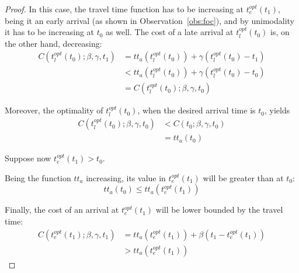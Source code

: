 \begin{proof}
  In this case, the travel time function has to be increasing at \(t_e^{opt}(t_1)\),
  being it an early arrival (as shown in Observation~\ref{obs:foc}),
  and by unimodality it has to be increasing at \(t_0\) as well.
  The cost of a late arrival at \(t_l^{opt}(t_0)\) is, on the other hand, decreasing:
  \begin{equation}
    \label{eq:cost-comp-1}
    \begin{split}
      C(t_l^{opt}(t_0); \beta, \gamma, t_1) & = tt_a(t_l^{opt}(t_0)) + \gamma(t_l^{opt}(t_0) - t_1) \\
                                            & < tt_a(t_l^{opt}(t_0)) + \gamma(t_l^{opt}(t_0) - t_0) \\
                                            & = C(t_l^{opt}(t_0); \beta, \gamma, t_0)
    \end{split}
  \end{equation}

  Moreover, the optimality of \(t_l^{opt}(t_0)\), when the desired arrival time is \(t_0\), yields
  \begin{equation}
    \label{eq:cost-comp-2}
    \begin{split}
      C(t_l^{opt}(t_0); \beta, \gamma, t_0) & < C(t_0; \beta, \gamma, t_0) \\
                                            & = tt_a(t_0)
    \end{split}
  \end{equation}

  Suppose now \(t_e^{opt}(t_1) > t_0\).

  Being the function \(tt_a\) increasing, its value in \(t_e^{opt}(t_1)\) will be greater than at \(t_0\):
  \begin{equation}
    \label{eq:decreasing-tt_a}
    tt_a(t_0) \leq tt_a(t_e^{opt}(t_1))
  \end{equation}

  Finally, the cost of an arrival at \(t_e^{opt}(t_1)\) will be lower bounded by the travel time:
  \begin{equation}
    \label{eq:cost-low-bound}
    \begin{split}
      C(t_e^{opt}(t_1); \beta, \gamma, t_1) & = tt_a(t_e^{opt}(t_1)) + \beta(t_1 - t_e^{opt}(t_1)) \\
                                            & > tt_a(t_e^{opt}(t_1))
    \end{split}
  \end{equation}


\end{proof}
